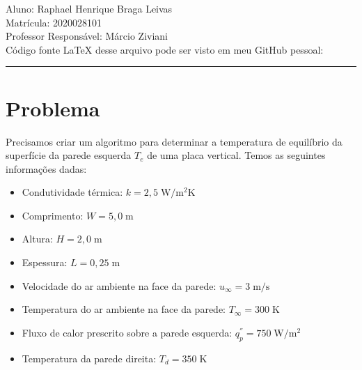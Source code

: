 \documentclass[12pt]{scrartcl}
\newcommand{\un}[1]{\;\textrm{#1}}
\begin{document}



\pagestyle{fancy}

\fancyhead{}
\fancyfoot{}

\begin{center}
    Aluno: Raphael Henrique Braga Leivas \\
    Matrícula: 2020028101 \\
    Professor Responsável: Márcio Ziviani \\[20pt]

    Código fonte LaTeX desse arquivo pode ser visto em meu GitHub pessoal:
\end{center}

\hrule

\section{Problema}

Precisamos criar um algoritmo para determinar a temperatura de equilíbrio da superfície
da parede esquerda $T_e$ de uma placa vertical. Temos as seguintes informações dadas:

\begin{itemize}
    \item Condutividade térmica: $k=2,5 \un{W/m$^2$K}$
    \item Comprimento: $W=5,0 \un{m}$
    \item Altura: $H=2,0 \un{m}$
    \item Espessura: $L=0,25 \un{m}$
    \item Velocidade do ar ambiente na face da parede: $u_{\infty}=3 \un{m/s}$
    \item Temperatura do ar ambiente na face da parede: $T_{\infty}=300 \un{K}$
    \item Fluxo de calor prescrito sobre a parede esquerda: $q_{p}^{''}=750 \un{W/m$^2$}$
    \item Temperatura da parede direita: $T_d=350 \un{K}$
\end{itemize}
\end{document}
